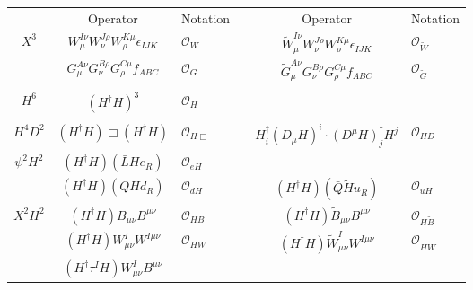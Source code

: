 \begin{table}
  \begin{center}
    \begin{tabular}{cclccl}
      \toprule
      & Operator & Notation & & Operator & Notation \\
      \cmidrule{2-3} \cmidrule{5-6}
      \multirow{2}{*}{$X^3$}
      &
      $W^{I\nu }_{\mu} W^{J\rho}_{\nu} W^{K \mu}_{\rho} \epsilon_{IJK} $ &
      $\mathcal{O}_{W}$ &
      &
      $\tilde{W}^{I \nu}_{\mu} W^{J\rho}_{\nu} W^{K\mu}_{\rho} \epsilon_{IJK}$ &
      $\mathcal{O}_{\tilde{W}}$ \\
      &
      $G^{A\nu}_\mu G^{B\rho}_\nu G^{C\mu}_\rho f_{ABC}$ &
      $\mathcal{O}_{G}$ &
      &
      $\tilde{G}^{A\nu}_\mu G^{B\rho}_\nu G^{C\mu}_\rho f_{ABC}$ &
      $\mathcal{O}_{\tilde{G}}$ \\[1mm]
      \midrule[0.25mm]
      \vspace{-5mm} & & & & \\
      $H^6$ &
      $(H^{\dagger} H)^3$ &
      $\mathcal{O}_{H}$ &
      & & \\[1mm]
      \midrule[0.25mm]
      \vspace{-5mm} & & & & \\
      $H^4 D^2$ &
      $(H^{\dagger} H )\Box (H^{\dagger} H)$ &
      $\mathcal{O}_{H \Box}$ &
      &
      $H^{\dagger}_{i} (D_\mu H)^{i} \cdot (D^\mu H)_{j}^{\dagger} H^{j}$ &
      $\mathcal{O}_{H D}$ \\[1mm]
      \midrule[0.25mm]
      \multirow{2}{*}{$\psi^2 H^2$} &
      $(H^{\dagger} H) (\bar{L} H e_R)$ &
      $\mathcal{O}_{e H}$ & & \\
      &
      $(H^{\dagger} H)
      (\bar{Q} H d_R)$ &
      $\mathcal{O}_{d H}$ &
      &
      $(H^{\dagger} H)
      (\bar{Q} \tilde{H} u_R )$ &
      $\mathcal{O}_{u H}$ \\[1mm]
      \midrule[0.25mm]
      \multirow{4}{*}{$X^2 H^2$} &
      $(H^\dagger H) B_{\mu\nu} B^{\mu\nu} $ &
      $\mathcal{O}_{H B}$ &
      &
      $(H^\dagger H) \tilde{B}_{\mu\nu} B^{\mu\nu}$ &
      $\mathcal{O}_{H \tilde{B}}$ \\
      &
      $(H^\dagger H) W_{\mu\nu}^I W^{I\mu\nu} $ &
      $\mathcal{O}_{H W}$ &
      &
      $(H^\dagger H) \tilde{W}_{\mu\nu}^I W^{I\mu\nu}$ &
      $\mathcal{O}_{H \tilde{W}}$ \\
      &
      $(H^\dagger \tau^I H) W^I_{\mu\nu} B^{\mu\nu}$ &

\end{tabular}
\end{center}
\end{table}
